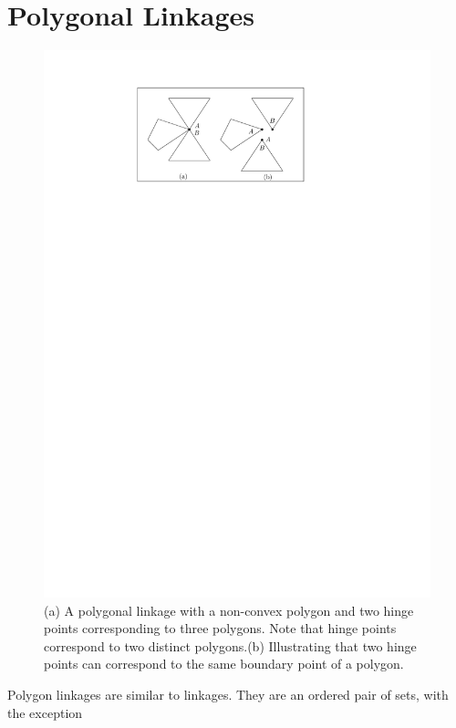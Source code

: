 \section{Polygonal Linkages}
\begin{figure}[h]
\begin{center}
\includegraphics[scale=1]{graphics/hingeOnThreeDistinctPolygons.pdf}
\end{center} 
\caption{(a) A polygonal linkage with a non-convex polygon and two hinge points corresponding to 
three polygons.  Note that hinge points correspond to two distinct polygons.(b) Illustrating that 
two hinge points can correspond to the same boundary point of a polygon.}
\label{fig:linkage-1}
\end{figure}
Polygon linkages are similar to linkages.  They are an ordered pair of sets, with the exception 
